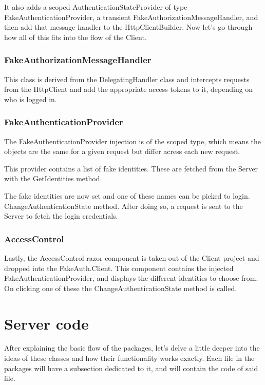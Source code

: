 It also adds a scoped AuthenticationStateProvider of type FakeAuthenticationProvider, a transient FakeAuthorizationMessageHandler, and then add that message handler to the HttpClientBuilder. Now let's go through how all of this fits into the flow of the Client.

\subsubsection{FakeAuthorizationMessageHandler}

This class is derived from the DelegatingHandler class and intercepts requests from the HttpClient and add the appropriate access tokens to it, depending on who is logged in.

\subsubsection{FakeAuthenticationProvider}

The FakeAuthenticationProvider injection is of the scoped type, which means the objects are the same for a given request but differ acress each new request.

This provider contains a list of fake identities. These are fetched from the Server with the GetIdentities method.

The fake identities are now set and one of these names can be picked to login. ChangeAuthenticationState method. After doing so, a request is sent to the Server to fetch the login credentials.

\subsubsection{AccessControl}

Lastly, the AccessControl razor component is taken out of the Client project and dropped into the FakeAuth.Client. This component contains the injected FakeAuthenticationProvider, and displays the different identities to choose from. On clicking one of these the ChangeAuthenticationState method is called.

\section{Server code}
\label{ch:package-server}

After explaining the basic flow of the packages, let's delve a little deeper into the ideas of these classes and how their functionality works exactly. Each file in the packages will have a subsection dedicated to it, and will contain the code of said file.

